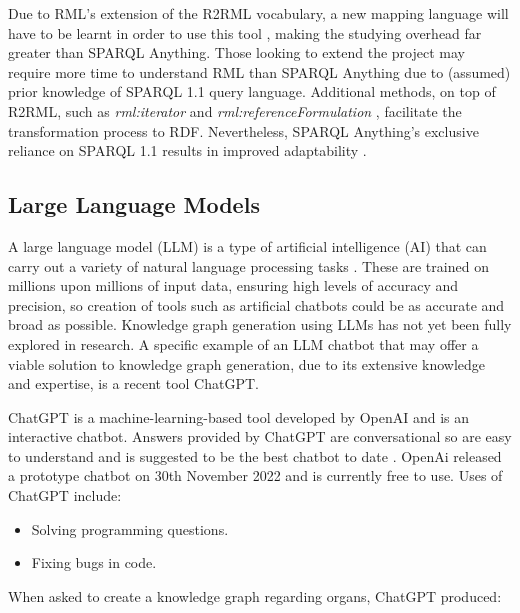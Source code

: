Due to RML's extension of the R2RML vocabulary, a new mapping language will have to be learnt in order to use this tool \cite{sparqlanything}, making the studying overhead far greater than SPARQL Anything. Those looking to extend the project may require more time to understand RML than SPARQL Anything due to (assumed) prior knowledge of SPARQL 1.1 query language. Additional methods, on top of R2RML, such as \textit{rml:iterator} and \textit{rml:referenceFormulation} \cite{dimou2014rml}, facilitate the transformation process to RDF. Nevertheless, SPARQL Anything's exclusive reliance on SPARQL 1.1 results in improved adaptability \cite{sparqlanything}.  

\subsection{Large Language Models}
\hspace{0.5cm} A large language model (LLM) is a type of artificial intelligence (AI) that can carry out a variety of natural language processing tasks \cite{rouse_2023}. These are trained on millions upon millions of input data, ensuring high levels of accuracy and precision, so creation of tools such as artificial chatbots could be as accurate and broad as possible. Knowledge graph generation using LLMs has not yet been fully explored in research. A specific example of an LLM chatbot that may offer a viable solution to knowledge graph generation, due to its extensive knowledge and expertise, is a recent tool ChatGPT. 

ChatGPT is a machine-learning-based tool developed by OpenAI and is an interactive chatbot. Answers provided by ChatGPT are conversational so are easy to understand and is suggested to be the best chatbot to date \cite{chatgpt}. OpenAi released a prototype chatbot on 30th November 2022 and is currently free to use. Uses of ChatGPT include:

\vspace{-0.15cm}
\begin{itemize}
    \itemsep0em 
\item Solving programming questions.
\vspace{-0.1cm}
\item Fixing bugs in code.
\end{itemize}
\vspace{-0.15cm}

\noindent When asked to create a knowledge graph regarding organs, ChatGPT produced:

